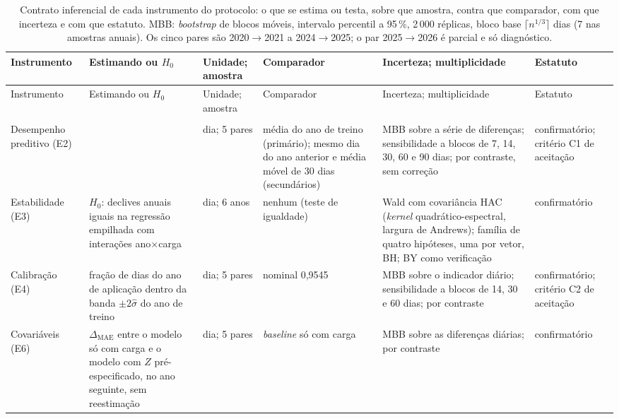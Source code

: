 {\footnotesize
\begin{xltabular}{\linewidth}{@{}>{\raggedright\arraybackslash}p{1.9cm}>{\raggedright\arraybackslash}X>{\raggedright\arraybackslash}p{1.8cm}>{\raggedright\arraybackslash}p{2.6cm}>{\raggedright\arraybackslash}X>{\raggedright\arraybackslash}p{1.9cm}@{}}
\caption[Contrato inferencial de cada instrumento]{Contrato inferencial
  de cada instrumento do protocolo: o que se estima ou testa, sobre que
  amostra, contra que comparador, com que incerteza e com que estatuto.
  MBB: \emph{bootstrap} de blocos móveis, intervalo percentil a 95\,\%,
  2\,000 réplicas, bloco base $\lceil n^{1/3}\rceil$ dias (7 nas amostras
  anuais). Os cinco pares são 2020${\to}$2021 a 2024${\to}$2025; o par
  2025${\to}$2026 é parcial e só diagnóstico.}\label{tab:contrato-inferencial}\\
\toprule
Instrumento & Estimando ou $H_0$ & Unidade; amostra & Comparador & Incerteza; multiplicidade & Estatuto \\
\midrule
\endfirsthead
\toprule
Instrumento & Estimando ou $H_0$ & Unidade; amostra & Comparador & Incerteza; multiplicidade & Estatuto \\
\midrule
\endhead
\midrule
{}\\
\endfoot
\bottomrule
\endlastfoot
    Desempenho preditivo (E2) &  & dia; 5 pares & média do ano de treino (primário); mesmo dia do ano anterior e média móvel de 30 dias (secundários) & MBB sobre a série de diferenças; sensibilidade a blocos de 7, 14, 30, 60 e 90 dias; por contraste, sem correção & confirmatório; critério C1 de aceitação \\
    \addlinespace
    Estabilidade (E3) & $H_0$: declives anuais iguais na regressão empilhada com interações ano$\times$carga & dia; 6 anos & nenhum (teste de igualdade) & Wald com covariância HAC (\emph{kernel} quadrático-espectral, largura de Andrews); família de quatro hipóteses, uma por vetor, BH; BY como verificação & confirmatório \\
    \addlinespace
    Calibração (E4) & fração de dias do ano de aplicação dentro da banda $\pm2\hat\sigma$ do ano de treino & dia; 5 pares & nominal 0,9545 & MBB sobre o indicador diário; sensibilidade a blocos de 14, 30 e 60 dias; por contraste & confirmatório; critério C2 de aceitação \\
    \addlinespace
    Covariáveis (E6) & $\Delta_{\mathrm{MAE}}$ entre o modelo só com carga e o modelo com $Z$ pré-especificado, no ano seguinte, sem reestimação & dia; 5 pares & \emph{baseline} só com carga & MBB sobre as diferenças diárias; por contraste & confirmatório \\

\end{xltabular}}

